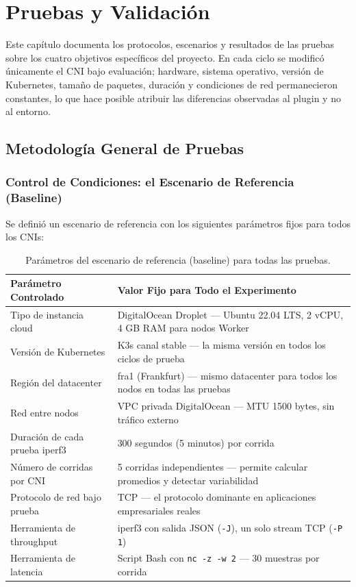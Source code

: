 \section{Pruebas y Validación}

Este capítulo documenta los protocolos, escenarios y resultados de las pruebas sobre los cuatro objetivos específicos del proyecto. En cada ciclo se modificó únicamente el CNI bajo evaluación; hardware, sistema operativo, versión de Kubernetes, tamaño de paquetes, duración y condiciones de red permanecieron constantes, lo que hace posible atribuir las diferencias observadas al plugin y no al entorno.

\subsection{Metodología General de Pruebas}

\subsubsection{Control de Condiciones: el Escenario de Referencia (Baseline)}

Se definió un escenario de referencia con los siguientes parámetros fijos para todos los CNIs:

\begin{table}[htbp]
\centering
\scriptsize
\begin{tabularx}{\textwidth}{|Y|Y|}
\hline
\textbf{Parámetro Controlado} & \textbf{Valor Fijo para Todo el Experimento} \\
\hline
Tipo de instancia cloud & DigitalOcean Droplet --- Ubuntu 22.04 LTS, 2 vCPU, 4 GB RAM para nodos Worker \\
Versión de Kubernetes & K3s canal stable --- la misma versión en todos los ciclos de prueba \\
Región del datacenter & fra1 (Frankfurt) --- mismo datacenter para todos los nodos en todas las pruebas \\
Red entre nodos & VPC privada DigitalOcean --- MTU 1500 bytes, sin tráfico externo \\
Duración de cada prueba iperf3 & 300 segundos (5 minutos) por corrida \\
Número de corridas por CNI & 5 corridas independientes --- permite calcular promedios y detectar variabilidad \\
Protocolo de red bajo prueba & TCP --- el protocolo dominante en aplicaciones empresariales reales \\
Herramienta de throughput & iperf3 con salida JSON (\texttt{-J}), un solo stream TCP (\texttt{-P 1}) \\
Herramienta de latencia & Script Bash con \texttt{nc -z -w 2} --- 30 muestras por corrida \\
\hline
\end{tabularx}
\caption{Parámetros del escenario de referencia (baseline) para todas las pruebas.}
\end{table}

